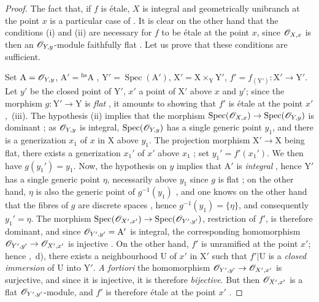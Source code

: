 \begin{proof}
The fact that, if $f$ is \'etale, $X$ is integral and geometrically unibranch at the point $x$ is a particular case of .
It is clear on the other hand that the conditions (i) and (ii) are necessary for $f$ to be \'etale at the point $x$, since $\mathscr{O}_{X,x}$ is then an $\mathscr{O}_{Y,y}$-module faithfully flat .
Let us prove that these conditions are sufficient.

Set $\mathrm{A}=\mathscr{O}_{Y,y}$, $\mathrm{A}'={}^{\mathrm{hs}}\mathrm{A}$ , $\mathrm{Y}'=\operatorname{Spec}(\mathrm{A}')$, $\mathrm{X}'=\mathrm{X}\times_{\mathrm{Y}}\mathrm{Y}'$, $f'=f_{(\mathrm{Y}')}:\mathrm{X}'\to\mathrm{Y}'$.
Let $y'$ be the closed point of $\mathrm{Y}'$, $x'$ a point of $\mathrm{X}'$ above $x$ and $y'$; since the morphism $g:\mathrm{Y}'\to\mathrm{Y}$ is \emph{flat} , it amounts to showing that $f'$ is \'etale at the point $x'$ ,~(iii).
The hypothesis (ii) implies that the morphism $\operatorname{Spec}(\mathscr{O}_{X,x})\to\operatorname{Spec}(\mathscr{O}_{Y,y})$ is dominant ; as $\mathscr{O}_{Y,y}$ is integral, $\operatorname{Spec}(\mathscr{O}_{Y,y})$ has a single generic point $y_1$, and there is a generization $x_1$ of $x$ in $\mathrm{X}$ above $y_1$.
The projection morphism $\mathrm{X}'\to\mathrm{X}$ being flat, there exists a generization $x_1'$ of $x'$ above $x_1$ ; set $y_1'=f'(x_1')$. We then have $g(y_1')=y_1$.
Now, the hypothesis on $y$ implies that $\mathrm{A}'$ is \emph{integral} , hence $\mathrm{Y}'$ has a single generic point $\eta$, necessarily above $y_1$ since $g$
is flat ; on the other hand, $\eta$ is also the generic point of $g^{-1}(y_1)$ , and one knows on the other hand that the fibres of $g$ are discrete spaces , hence $g^{-1}(y_1)=\{\eta\}$, and consequently $y_1'=\eta$.
The morphism $\operatorname{Spec}(\mathscr{O}_{X',x'})\to\operatorname{Spec}(\mathscr{O}_{Y',y'})$, restriction of $f'$, is therefore dominant, and since $\mathscr{O}_{Y',y'}=\mathrm{A}'$ is integral, the corresponding homomorphism $\mathscr{O}_{Y',y'}\to\mathscr{O}_{X',x'}$ is injective .
On the other hand, $f'$ is unramified at the point $x'$; hence ,~d), there exists a neighbourhood $\mathrm{U}$ of $x'$ in $\mathrm{X}'$ such that $f'|\mathrm{U}$ is a \emph{closed immersion} of $\mathrm{U}$ into $\mathrm{Y}'$.
\emph{A fortiori} the homomorphism $\mathscr{O}_{Y',y'}\to\mathscr{O}_{X',x'}$ is surjective, and since it is injective, it is therefore \emph{bijective}.
But then $\mathscr{O}_{X',x'}$ is a flat $\mathscr{O}_{Y',y'}$-module, and $f'$ is therefore \'etale at the point $x'$ .


\end{proof}
